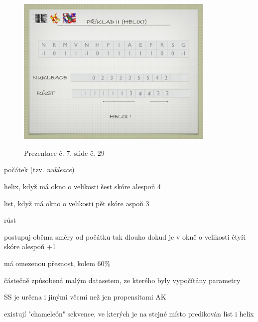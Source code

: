 \documentclass[DIV=8]{scrreprt}
\begin{document}
\begin{myItemize}[nosep]
\begin{figure}
    \centering
    \label{slides-7-slide-28}
\end{figure}
\begin{figure}
    \caption{Prezentace č. 7, slide č. 29}
    \includegraphics[width=0.85\textwidth]{slides-7/slide-29.jpg}
    \centering
    \label{slides-7-slide-29}
\end{figure}

\begin{myEnumerate}[nosep]
    \item počátek (tzv. \emph{nukleace})
\begin{myItemize}[nosep]
    \item helix, když má okno o velikosti šest skóre alespoň 4
    \item list, když má okno o velikosti pět skóre aspoň 3
\end{myItemize}

    \item růst
\begin{myItemize}[nosep]
    \item postupuj oběma směry od počátku tak dlouho dokud je v okně o velikosti čtyři skóre alespoň +1
\end{myItemize}

\end{myEnumerate}

    \item má omezenou přesnost, kolem 60\%
\begin{myItemize}[nosep]
    \item částečně způsobená malým datasetem, ze kterého byly vypočítány parametry
    \item SS je určena i jinými věcmi než jen propensitami AK
    \item existují "chameleón" sekvence, ve kterých je na stejné místo predikován list i helix
\end{myItemize}

\end{myItemize}
\end{document}
